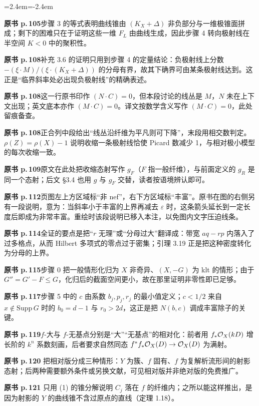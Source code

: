 \begin{list}{}{\leftmargin=2.4em\itemindent=-2.4em\itemsep=2pt\parsep=0pt}
\item \textbf{原书 p.\,105}\quad 步骤 3 的等式表明曲线锥由 $(K_X+\Delta)$ 非负部分与一维极锥面拼成；剩下的困难只在于证明这些一维 $F_L$ 由曲线生成，因此步骤 4 转向极射线在半空间 $K<0$ 中的聚积性。
\item \textbf{原书 p.\,108}\quad 补充 3.6 的证明只用到步骤 4 的定量结论：负极射线上分数 $-(\xi\cdot M)/(\xi\cdot(K_X+\Delta))$ 的分母有界，故其下确界可由某条极射线达到。这正是“临界斜率处必出现负极射线”的精确表述。
\item \textbf{原书 p.\,108}\quad 这一行原书印作 $(N\cdot C)=0$，但本段讨论的线丛是 $M$，$N$ 未在上下文出现；英文底本亦作 $(M\cdot C)=0$。译文按数学含义写作 $(M\cdot C)=0$，此处留痕备查。
\item \textbf{原书 p.\,108}\quad 正合列中段给出“线丛沿纤维为平凡则可下降”，末段用相交数判定。$\rho(Z)=\rho(X)-1$ 说明收缩一条极射线恰使 Picard 数减少 1，与相对极小模型的每次收缩一致。
\item \textbf{原书 p.\,109}\quad 原文在此处把收缩态射写作 $g_F$（$F$ 指一般纤维），与前面定义的 $g_R$ 是同一个态射；后文 §3.4 也用 $g$ 与 $g_F$ 交替，读者按语境辨认即可。
\item \textbf{原书 p.\,112}\quad 页图左上方区域标“非 nef”，右下方区域标“丰富”。原书在图的右侧另有一段说明，意为：当斜率小于丰富的上界再减去 $\varepsilon$ 时，这条箭头延长到一定长度后即成为非常丰富。重绘时该段说明已移入本注，以免图内文字压迫线条。
\item \textbf{原书 p.\,114}\quad 全证的要点是把“$r$ 无理”或“分母过大”翻译成：带宽 $aq-rp$ 内落入了过多格点，从而 Hilbert 多项式的零点过于密集；引理 3.19 正是把这种密度转化为分母的上界。
\item \textbf{原书 p.\,115}\quad 步骤 0 把一般情形化归为 $X$ 非奇异、$(X,-G)$ 为 klt 的情形；由于 $G''=G'-F\le G$，化归后的截面空间更小，故在那里证明非零性即已足够。
\item \textbf{原书 p.\,117}\quad 步骤 5 中的 $c$ 由系数 $b_j,p_j,r_j$ 的最小值定义；$c<1/2$ 来自 $x\notin\mathrm{Supp}\,G$ 时的 $b_0=d-1$ 与 $r_0>2d$，这正是把 $N(b,c)$ 调成丰富除子的关键。
\item \textbf{原书 p.\,119}\quad $f$-大与 $f$-无基点分别是“大”“无基点”的相对化：前者用 $f_*\mathcal{O}_X(kD)$ 增长阶的 $k^n$ 系数刻画，后者要求自然同态 $f^*f_*\mathcal{O}_X(D)\to\mathcal{O}_X(D)$ 为满射。
\item \textbf{原书 p.\,120} 把相对版分成三种情形：$Y$ 为簇、$f$ 固有、$f$ 为复解析流形间的射影态射；后两种需要额外条件或另换文献，可见相对版并非绝对版的免费推广。
\item \textbf{原书 p.\,121} 只用 (1) 的锥分解说明 $C_j$ 落在 $f$ 的纤维内；之所以能这样推出，是因为射影的 $Y$ 的曲线锥不含过原点的直线（定理 1.18）。

\end{list}
